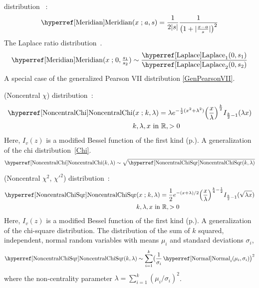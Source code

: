 \secbreak
 distribution~\cite[Eq.\ 18]{Aysal2007} :
\begin{align}
\label{Meridian}
	\opr{Meridian}(x\given a,s) = \frac{1}{2|s|} \frac{1}{\Left(1 + |\tfrac{x-a}{s}| \Right)^2} \checked
\end{align}
The Laplace ratio distribution~\cite{Aysal2007}.
\[
\opr{Meridian}(x\given 0,\tfrac{s_1}{s_2}) \sim \frac{\opr{Laplace}_1(0,s_1)} {\opr{Laplace}_2(0,s_2)}
\checked
\notag
\]
A special case of the generalized Pearson VII distribution \eqref{GenPearsonVII}. 


\secbreak
 (Noncentral $\chi$) distribution~\cite{Fisher1928,Johnson1995}:
\begin{align}
\label{NoncentralChi}
\opr{NoncentralChi}&(x\given k,\lambda) =
\lambda e^{-\frac{1}{2}(x^2+\lambda^2)} \Left(\frac{x}{\lambda}\Right)^{\frac{k}{2}} I_{\frac{k}{2}-1}(\lambda x)
\\ & k, \lambda, x \text{ in } \mathbb{R}, >0
\notag
\end{align}
Here, $I_v(z)$ is a modified Bessel function of the first kind (p.\pageref{ModBesselFirst}). A generalization of the chi distribution~\eqref{Chi}.
\[
\opr{NoncentralChi}(k,\lambda) \sim \sqrt{\opr{NoncentralChiSqr}(k,\lambda)} \notag
\]




\secbreak
 (Noncentral $\chi^2$, ${\chi'}^2$) distribution~\cite{Fisher1928,Johnson1995}:
\begin{align}
\label{NoncentralChiSqr}
\opr{NoncentralChiSqr}&(x\given k,\lambda) =
\frac{1}{2}e^{-(x+\lambda)/2} \Left(\frac{x}{\lambda}\Right)^{\frac{k}{4} -\frac{1}{2}} I_{\frac{k}{2}-1}(\sqrt{\lambda x})
\checked
\\ & k, \lambda, x \text{ in } \mathbb{R}, >0
\notag
\end{align}
Here, $I_v(z)$ is a modified Bessel function of the first kind (p.\pageref{ModBesselFirst}). A generalization of the chi-square distribution. The distribution of the sum of $k$ squared, independent, normal random variables with means $\mu_i$ and standard deviations $\sigma_i$,
\[
\opr{NoncentralChiSqr}(k,\lambda) \sim \sum_{i=1}^{k} \bigl(\frac{1}{\sigma_i} \opr{Normal}_i(\mu_i, \sigma_i)\bigr)^2 \checked
\notag
\]
where the non-centrality parameter $\lambda = \sum_{i=1}^k (\mu_i/\sigma_i)^2$. \checked



